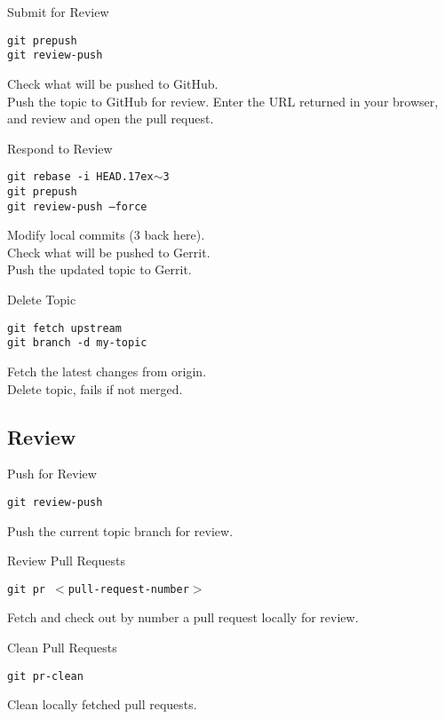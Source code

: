 \documentclass[10pt]{article}
\newlength{\cvsep}
\newlength{\cvtitles}
\newlength{\cvmain}
\newenvironment{category}[1]
  {\parbox[t]{\cvtitles}{\large\sc\centering #1}\hspace*{\cvsep}\begin{minipage}[t]{\cvmain}}
  {\end{minipage}\vspace*{0.35cm}}
\begin{document}
\begin{category}{Submit for Review}
\parbox[t]{0.6\cvmain}{%
  \texttt{git prepush\\ git review-push}
}
\parbox[t]{0.38\cvmain}{%
Check what will be pushed to GitHub.\\
Push the topic to GitHub for review.
Enter the URL returned in your browser, and review and open the pull request.
}
\end{category}
\begin{category}{Respond to Review}
\parbox[t]{0.6\cvmain}{%
  \texttt{git rebase -i HEAD{\raise.17ex\hbox{$\scriptstyle\sim$}}3\\ git prepush\\ git review-push --force}
}
\parbox[t]{0.38\cvmain}{%
Modify local commits (3 back here).\\
Check what will be pushed to Gerrit.\\
Push the updated topic to Gerrit.
}
\end{category}
\begin{category}{Delete Topic}
\parbox[t]{0.6\cvmain}{%
  \texttt{git fetch upstream\\ git branch -d my-topic}
}
\parbox[t]{0.38\cvmain}{%
Fetch the latest changes from origin.\\
Delete topic, fails if not merged.
}
\end{category}

\newpage
\subsection*{Review}
\begin{category}{Push for Review}
\parbox[t]{0.6\cvmain}{%
  \texttt{git review-push}
}
\parbox[t]{0.38\cvmain}{%
Push the current topic branch for review.
}
\end{category}
\begin{category}{Review Pull Requests}
\parbox[t]{0.6\cvmain}{%
  \texttt{git pr $<$pull-request-number$>$}
}
\parbox[t]{0.38\cvmain}{%
Fetch and check out by number a pull request locally for review.
}
\end{category}
\begin{category}{Clean Pull Requests}
\parbox[t]{0.6\cvmain}{%
  \texttt{git pr-clean}
}
\parbox[t]{0.38\cvmain}{%
Clean locally fetched pull requests.
}
\end{category}
\end{document}
